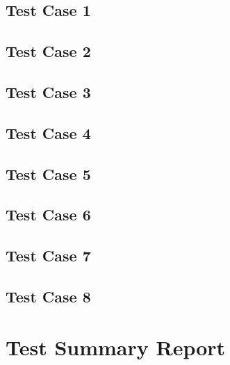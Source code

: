 \documentclass[11pt]{article}
\begin{document}
\subsection{Test Case 1}
\subsection{Test Case 2}
\subsection{Test Case 3}
\subsection{Test Case 4}
\subsection{Test Case 5}
\subsection{Test Case 6}
\subsection{Test Case 7}
\subsection{Test Case 8}

\section{Test Summary Report}%
\end{document}

